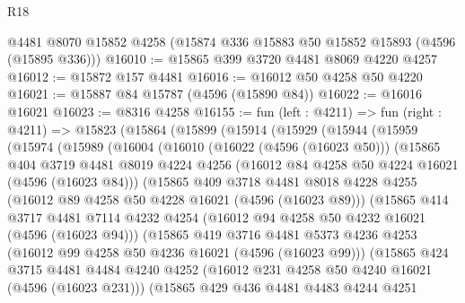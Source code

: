 \begin{lexlean}{R18}
\begin{coremodule}
    @4481
    @8070
    @15852
    @4258
    (@15874 @336 @15883 @50 @15852 @15893 (@4596 (@15895 @336)))
@16010 := @15865 @399 @3720 @4481 @8069 @4220 @4257
@16012 := @15872 @157 @4481
@16016 := @16012 @50 @4258 @50 @4220
@16021 := @15887 @84 @15787 (@4596 (@15890 @84))
@16022 := @16016 @16021
@16023 := @8316 @4258
@16155 := fun (left : @4211) =>
  fun (right : @4211) =>
  @15823
    (@15864
      (@15899
        (@15914
          (@15929
            (@15944
              (@15959
                (@15974
                  (@15989
                    (@16004
                      (@16010
                        (@16022 (@4596 (@16023 @50)))
                        (@15865
                          @404
                          @3719
                          @4481
                          @8019
                          @4224
                          @4256
                          (@16012 @84 @4258 @50 @4224 @16021 (@4596 (@16023 @84)))
                          (@15865
                            @409
                            @3718
                            @4481
                            @8018
                            @4228
                            @4255
                            (@16012 @89 @4258 @50 @4228 @16021 (@4596 (@16023 @89)))
                            (@15865
                              @414
                              @3717
                              @4481
                              @7114
                              @4232
                              @4254
                              (@16012 @94 @4258 @50 @4232 @16021 (@4596 (@16023 @94)))
                              (@15865
                                @419
                                @3716
                                @4481
                                @5373
                                @4236
                                @4253
                                (@16012 @99 @4258 @50 @4236 @16021 (@4596 (@16023 @99)))
                                (@15865
                                  @424
                                  @3715
                                  @4481
                                  @4484
                                  @4240
                                  @4252
                                  (@16012 @231 @4258 @50 @4240 @16021 (@4596 (@16023 @231)))
                                  (@15865
                                    @429
                                    @436
                                    @4481
                                    @4483
                                    @4244
                                    @4251

\end{coremodule}
\end{lexlean}
